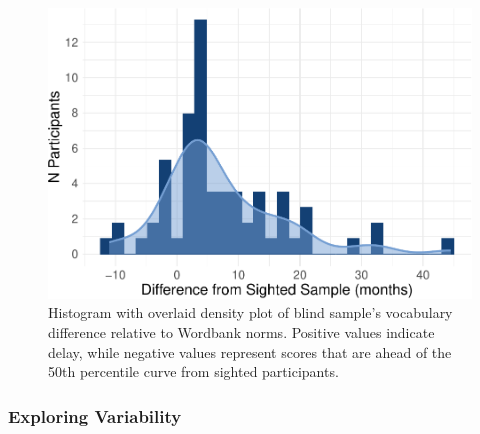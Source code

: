 \documentclass[english,man,floatsintext]{apa6}
\begin{document}
\begin{figure}
\centering
\includegraphics{VI_CDI_manuscript_files/figure-latex/density-plot-1.pdf}
\caption{\label{fig:density-plot}Histogram with overlaid density plot of blind sample's vocabulary difference relative to Wordbank norms. Positive values indicate delay, while negative values represent scores that are ahead of the 50th percentile curve from sighted participants.}
\end{figure}

\hypertarget{exploring-variability}{%
\subsubsection{Exploring Variability}\label{exploring-variability}}
\end{document}
